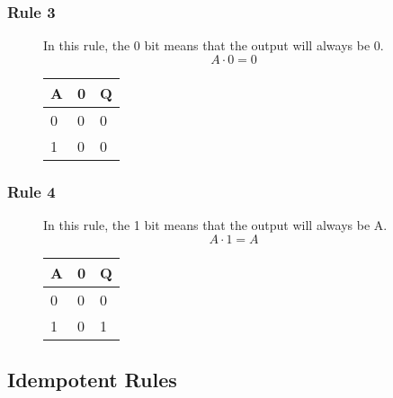 \subsubsection*{Rule 3}
\begin{figure}[H]
    \begin{minipage}[t]{0.65\textwidth}
        In this rule, the 0 bit means that the output will always be 0.
        \[A \cdot 0 = 0\]
    \end{minipage}\hfill
    \begin{minipage}[t]{0.25\textwidth}
        \begin{table}[H]
            \begin{tabularx}{0.5\textwidth}{XX|X}
                A & 0 & Q\\
                \hline
                0 & 0 & 0\\
                1 & 0 & 0\\
            \end{tabularx}
        \end{table}
    \end{minipage}\hfill
\end{figure}

\subsubsection*{Rule 4}
\begin{figure}[H]
    \begin{minipage}[t]{0.65\textwidth}
        In this rule, the 1 bit means that the output will always be A.
        \[A \cdot 1 = A\]
    \end{minipage}\hfill
    \begin{minipage}[t]{0.25\textwidth}
        \begin{table}[H]
            \begin{tabularx}{0.5\textwidth}{XX|X}
                A & 0 & Q\\
                \hline
                0 & 0 & 0\\
                1 & 0 & 1\\
            \end{tabularx}
        \end{table}
    \end{minipage}\hfill
\end{figure}

\subsection*{Idempotent Rules}
